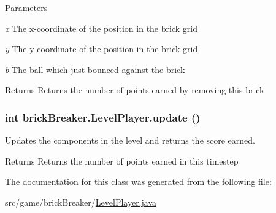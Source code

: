 \begin{DoxyParams}{Parameters}
\item[{\em x}]The x-\/coordinate of the position in the brick grid \item[{\em y}]The y-\/coordinate of the position in the brick grid \item[{\em b}]The ball which just bounced against the brick \end{DoxyParams}
\begin{DoxyReturn}{Returns}
Returns the number of points earned by removing this brick 
\end{DoxyReturn}
\hypertarget{classbrick_breaker_1_1_level_player_ad141c01fb30f6982c5b7932dd8ca901a}{
\subsubsection[{update}]{\setlength{\rightskip}{0pt plus 5cm}int brickBreaker.LevelPlayer.update ()}}
\label{classbrick_breaker_1_1_level_player_ad141c01fb30f6982c5b7932dd8ca901a}
Updates the components in the level and returns the score earned. \begin{DoxyReturn}{Returns}
Returns the number of points earned in this timestep 
\end{DoxyReturn}


The documentation for this class was generated from the following file:\begin{DoxyCompactItemize}
\item 
src/game/brickBreaker/\hyperlink{_level_player_8java}{LevelPlayer.java}\end{DoxyCompactItemize}
